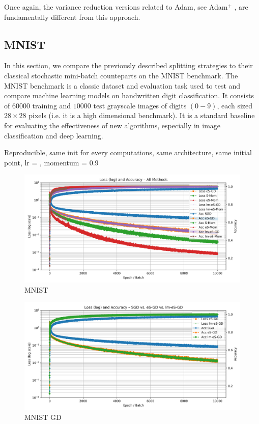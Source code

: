 \documentclass[article,authoryear,jmlmc]{beg_32}             %
\begin{document}
        Once again, the variance reduction versions related to Adam, see Adam$^+$ \cite{adam_variance1}, are fundamentally different from this approach.
\ \\

\subsection{MNIST}
\label{mnist}

In this section, we compare the previously described splitting strategies to their classical stochastic mini-batch counteparts on the MNIST benchmark. 
The MNIST benchmark is a classic dataset and evaluation task used to test and compare machine learning models on handwritten digit classification. 
It consists of $60000$ training and $10000$ test grayscale images of digits $(0-9)$, each sized $28\times 28$ pixels (i.e. it is a high dimensional benchmark). 
It is a standard baseline for evaluating the effectiveness of new algorithms, especially in image classification and deep learning.

Reproducible, same init for every computations, same architecture, same initial point, lr = , momentum = 0.9
\begin{figure}[!h]
  \includegraphics[width=0.8\linewidth]{chapitre5_img/comparison_plot_log.png}
  \caption{MNIST}
  \label{mnist_tout}
\end{figure}


\begin{figure}[!h]
  \includegraphics[width=0.8\linewidth]{chapitre5_img/GD_comparison_plot_log.png}
  \caption{MNIST GD}
  \label{mnist_gd}
\end{figure}
\end{document}
